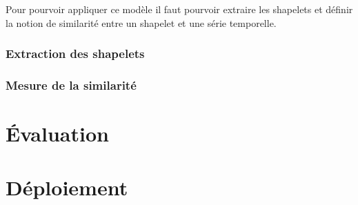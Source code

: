 Pour pourvoir appliquer ce modèle il faut pourvoir extraire les shapelets et définir la notion de similarité entre un shapelet et une série temporelle.

\subsubsection{Extraction des shapelets}

\subsubsection{Mesure de la similarité}

\section{Évaluation}
\section{Déploiement}